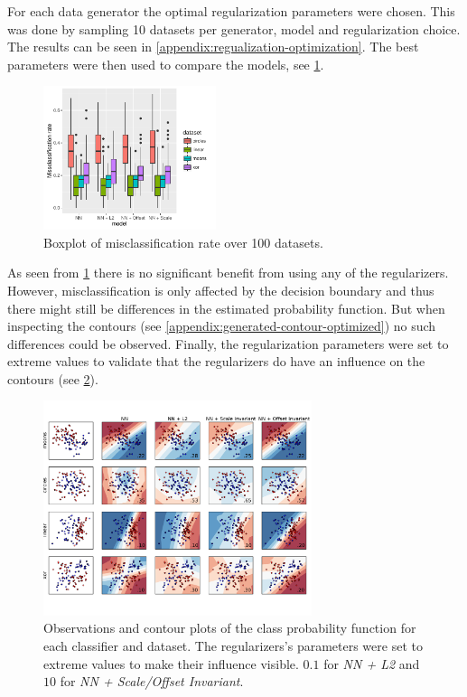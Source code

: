 For each data generator the optimal regularization parameters were chosen. This was done by sampling 10 datasets per generator, model and regularization choice. The results can be seen in \cref{appendix:regualization-optimization}. The best parameters were then used to compare the models, see \cref{fig:2d_significant}.

\begin{figure}[h]
	\centering
	\includegraphics[width=0.45\textwidth]{plots/2d_significant}
	\caption{Boxplot of misclassification rate over 100 datasets.}
	\label{fig:2d_significant}
\end{figure}

As seen from \cref{fig:2d_significant} there is no significant benefit from using any of the regularizers. However, misclassification is only affected by the decision boundary and thus there might still be differences in the estimated probability function. But when inspecting the contours (see \cref{appendix:generated-contour-optimized}) no such differences could be observed. Finally, the regularization parameters were set to extreme values to validate that the regularizers do have an influence on the contours (see \cref{plt:generated-contour-extream}).

\begin{figure}[ht]
	\centering
	\includegraphics[width=0.7\textwidth, trim = 0 2.2cm 0 1.5cm, clip]{plots/2d_classifier-extream}
	\caption{Observations and contour plots of the class probability function for each classifier and dataset. The regularizers's parameters were set to extreme values to make their influence visible. $0.1$ for \textit{NN + L2} and $10$ for \textit{NN + Scale/Offset Invariant}.}
	\label{plt:generated-contour-extream}
\end{figure}
